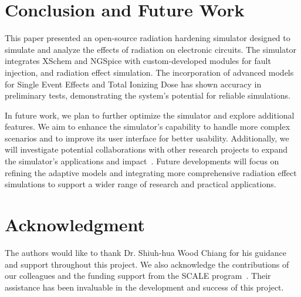 \documentclass[conference]{IEEEtran}
\begin{document}
    \section{Conclusion and Future Work}\label{sec:conclusion-and-future-work}
    This paper presented an open-source radiation hardening simulator designed to simulate and analyze the effects of radiation on electronic circuits.
    The simulator integrates XSchem and NGSpice with custom-developed modules for fault injection, and radiation effect simulation.
    The incorporation of advanced models for Single Event Effects and Total Ionizing Dose has shown accuracy in preliminary tests, demonstrating the system's potential for reliable simulations.

    In future work, we plan to further optimize the simulator and explore additional features.
    We aim to enhance the simulator's capability to handle more complex scenarios and to improve its user interface for better usability.
    Additionally, we will investigate potential collaborations with other research projects to expand the simulator's applications and impact~\cite{Pepper1990}.
    Future developments will focus on refining the adaptive models and integrating more comprehensive radiation effect simulations to support a wider range of research and practical applications.

    \section*{Acknowledgment}
    The authors would like to thank Dr. Shiuh-hua Wood Chiang for his guidance and support throughout this project.
    We also acknowledge the contributions of our colleagues and the funding support from the SCALE program~\cite{SCALE}.
    Their assistance has been invaluable in the development and success of this project.

    
    
\end{document}
